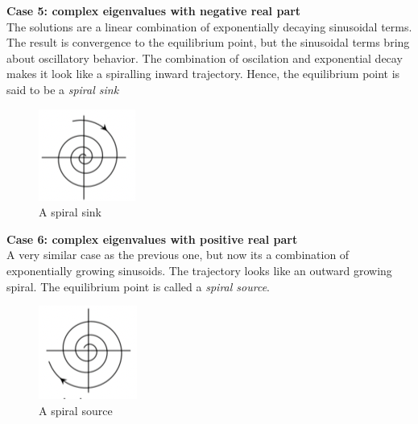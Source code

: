 \documentclass{article}
\begin{document}
\textbf{Case 5: complex eigenvalues with negative real part}\\
The solutions are a linear combination of exponentially decaying sinusoidal terms. The result is convergence to the equilibrium point, but the sinusoidal terms bring about oscillatory behavior. The combination of oscilation and exponential decay makes it look like a spiralling inward trajectory. Hence, the equilibrium point is said to be a \emph{spiral sink}

\begin{figure}[h]
    \centering
    \includegraphics[scale = 0.9]{spiral_sink.png}
    \caption{A spiral sink}
    \label{fig:my_label}
\end{figure}

\textbf{Case 6: complex eigenvalues with positive real part}\\
A very similar case as the previous one, but now its a combination of exponentially growing sinusoids. The trajectory looks like an outward growing spiral. The equilibrium point is called a \emph{spiral source}.

\begin{figure}[h]
    \centering
    \includegraphics[scale = 0.9]{spiral_source.png}
    \caption{A spiral source}
    \label{fig:my_label}
\end{figure}
\end{document}

